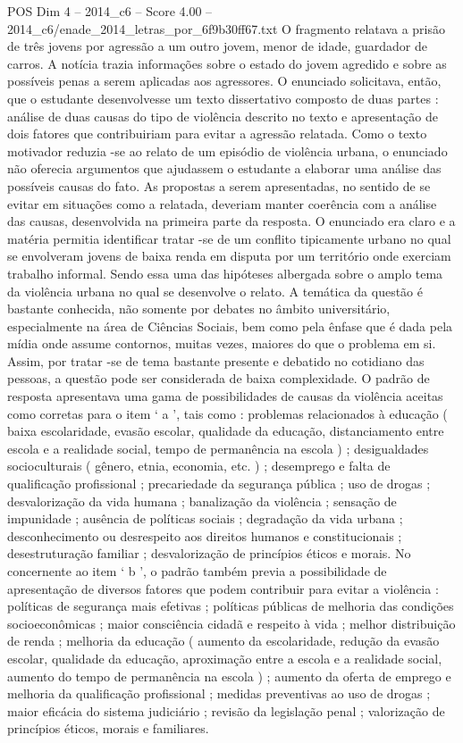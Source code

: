 \begin{textsample}{POS Dim 4 – 2014\_c6 – Score 4.00 – 2014\_c6/enade\_2014\_letras\_por\_6f9b30ff67.txt}
O fragmento relatava a prisão de três jovens por agressão a um outro jovem, menor de idade, guardador de carros.
A notícia trazia informações sobre o estado do jovem agredido e sobre as possíveis penas a serem aplicadas aos agressores.
O enunciado solicitava, então, que o estudante desenvolvesse um texto dissertativo composto de duas partes : análise de duas causas do tipo de violência descrito no texto e apresentação de dois fatores que contribuiriam para evitar a agressão relatada.
Como o texto motivador reduzia -se ao relato de um episódio de violência urbana, o enunciado não oferecia argumentos que ajudassem o estudante a elaborar uma análise das possíveis causas do fato.
As propostas a serem apresentadas, no sentido de se evitar em situações como a relatada, deveriam manter coerência com a análise das causas, desenvolvida na primeira parte da resposta.
O enunciado era claro e a matéria permitia identificar tratar -se de um conflito tipicamente urbano no qual se envolveram jovens de baixa renda em disputa por um território onde exerciam trabalho informal.
Sendo essa uma das hipóteses albergada sobre o amplo tema da violência urbana no qual se desenvolve o relato.
A temática da questão é bastante conhecida, não somente por debates no âmbito universitário, especialmente na área de Ciências Sociais, bem como pela ênfase que é dada pela mídia onde assume contornos, muitas vezes, maiores do que o problema em si.
Assim, por tratar -se de tema bastante presente e debatido no cotidiano das pessoas, a questão pode ser considerada de baixa complexidade.
O padrão de resposta apresentava uma gama de possibilidades de causas da violência aceitas como corretas para o item ‘ a ’, tais como : problemas relacionados à educação ( baixa escolaridade, evasão escolar, qualidade da educação, distanciamento entre escola e a realidade social, tempo de permanência na escola ) ; desigualdades socioculturais ( gênero, etnia, economia, etc. ) ; desemprego e falta de qualificação profissional ; precariedade da segurança pública ; uso de drogas ; desvalorização da vida humana ; banalização da violência ; sensação de impunidade ; ausência de políticas sociais ; degradação da vida urbana ; desconhecimento ou desrespeito aos direitos humanos e constitucionais ; desestruturação familiar ; desvalorização de princípios éticos e morais.
No concernente ao item ‘ b ’, o padrão também previa a possibilidade de apresentação de diversos fatores que podem contribuir para evitar a violência : políticas de segurança mais efetivas ; políticas públicas de melhoria das condições socioeconômicas ; maior consciência cidadã e respeito à vida ; melhor distribuição de renda ; melhoria da educação ( aumento da escolaridade, redução da evasão escolar, qualidade da educação, aproximação entre a escola e a realidade social, aumento do tempo de permanência na escola ) ; aumento da oferta de emprego e melhoria da qualificação profissional ; medidas preventivas ao uso de drogas ; maior eficácia do sistema judiciário ; revisão da legislação penal ; valorização de princípios éticos, morais e familiares.

\end{textsample}
